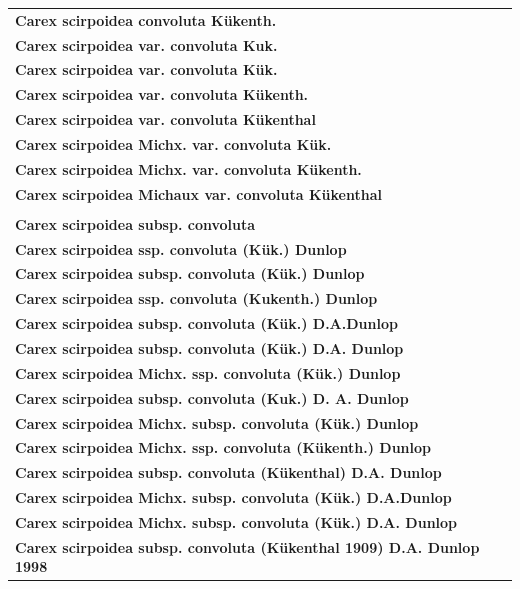 \documentclass{bmcart}
\begin{document}
\begin{table}[!htb]
\begin{center}
\begin{tabular}{| l | c |}
    \textbf{Carex scirpoidea convoluta Kükenth.} & \\
    \textbf{Carex scirpoidea var. convoluta Kuk.} & \\
    \textbf{Carex scirpoidea var. convoluta Kük.} & \\
    \textbf{Carex scirpoidea var. convoluta Kükenth.} & \\
    \textbf{Carex scirpoidea var. convoluta Kükenthal} & \\
    \textbf{Carex scirpoidea Michx. var. convoluta Kük.} & \\
    \textbf{Carex scirpoidea Michx. var. convoluta Kükenth.} & \\
    \textbf{Carex scirpoidea Michaux var. convoluta Kükenthal} & \\
    & \\
    \textbf{Carex scirpoidea subsp. convoluta} & \\
    \textbf{Carex scirpoidea ssp. convoluta (Kük.) Dunlop} & \\
    \textbf{Carex scirpoidea subsp. convoluta (Kük.) Dunlop} & \\
    \textbf{Carex scirpoidea ssp. convoluta (Kukenth.) Dunlop} & \\
    \textbf{Carex scirpoidea subsp. convoluta (Kük.) D.A.Dunlop} & \\
    \textbf{Carex scirpoidea subsp. convoluta (Kük.) D.A. Dunlop} & \\
    \textbf{Carex scirpoidea Michx. ssp. convoluta (Kük.) Dunlop} & \\
    \textbf{Carex scirpoidea subsp. convoluta (Kuk.) D. A. Dunlop} & \\
    \textbf{Carex scirpoidea Michx. subsp. convoluta (Kük.) Dunlop} & \\
    \textbf{Carex scirpoidea Michx. ssp. convoluta (Kükenth.) Dunlop} & \\
    \textbf{Carex scirpoidea subsp. convoluta (Kükenthal) D.A. Dunlop} & \\
    \textbf{Carex scirpoidea Michx. subsp. convoluta (Kük.) D.A.Dunlop} & \\
    \textbf{Carex scirpoidea Michx. subsp. convoluta (Kük.) D.A. Dunlop} & \\
    \textbf{Carex scirpoidea subsp. convoluta (Kükenthal 1909) D.A. Dunlop 1998} & \\
    \hline
    \end{tabular}
  \end{center}
\end{table}
\end{document}
